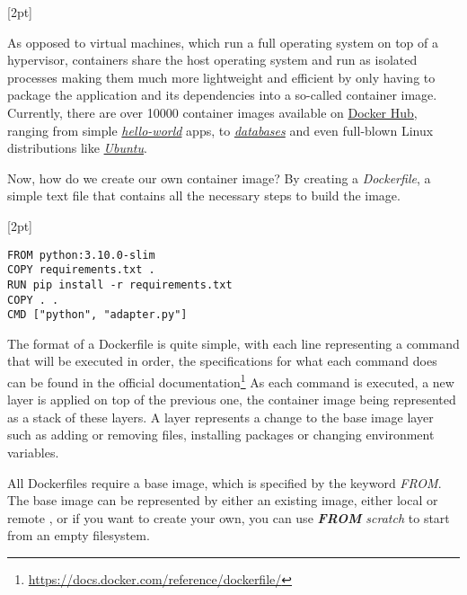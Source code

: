[2pt]

As opposed to virtual machines, which run a full operating system on top of a hypervisor, containers share the host operating system and run as isolated processes
making them much more lightweight and efficient by only having to package the application and its dependencies into a so-called container image.
Currently, there are over 10000 container images available on \href{https://hub.docker.com/}{Docker Hub}, ranging from simple \href{https://hub.docker.com/_/hello-world}{\textit{hello-world}} apps, to 
\href{https://hub.docker.com/search?categories=Databases+\%26+Storage}{\textit{databases}} and even full-blown Linux distributions like \href{https://hub.docker.com/_/ubuntu}{\textit{Ubuntu}}.

Now, how do we create our own container image? By creating a \textit{Dockerfile}, a simple text file that contains all the necessary steps to build the image.

[2pt]

\lstset{language=Dockerfile,caption=Sample Dockerfile,label=lst:ex-dockerfile}
\begin{lstlisting}
FROM python:3.10.0-slim
COPY requirements.txt .
RUN pip install -r requirements.txt
COPY . .
CMD ["python", "adapter.py"]    
\end{lstlisting}

The format of a Dockerfile is quite simple, with each line representing a command that will be executed in order, the specifications for what each command does can be found in the official documentation\footnote[1]{\href{https://docs.docker.com/reference/dockerfile/}{https://docs.docker.com/reference/dockerfile/}}
As each command is executed, a new layer is applied on top of the previous one, the container image being represented as a stack of these layers. A layer represents a change to the base image layer such as adding or removing files, installing packages or changing environment variables.


All Dockerfiles require a base image, which is specified by the keyword \textit{FROM}.
The base image can be represented by either an existing image, either local or remote , or if you want to create your own, you can use \textit{\textbf{FROM} scratch} to start from an empty filesystem.

